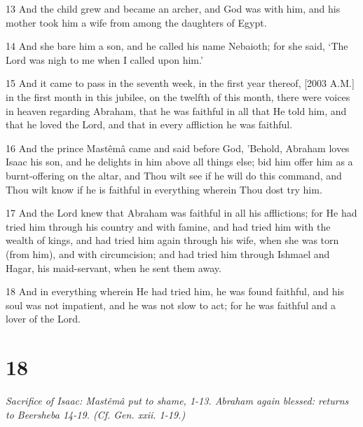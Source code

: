 \par 13 And the child grew and became an archer, and God was with him, and his mother took him a wife from among the daughters of Egypt.
\par 14 And she bare him a son, and he called his name Nebaioth; for she said, ‘The Lord was nigh to me when I called upon him.’
\par 15 And it came to pass in the seventh week, in the first year thereof, [2003 A.M.] in the first month in this jubilee, on the twelfth of this month, there were voices in heaven regarding Abraham, that he was faithful in all that He told him, and that he loved the Lord, and that in every affliction he was faithful.
\par 16 And the prince Mastêmâ came and said before God, 'Behold, Abraham loves Isaac his son, and he delights in him above all things else; bid him offer him as a burnt-offering on the altar, and Thou wilt see if he will do this command, and Thou wilt know if he is faithful in everything wherein Thou dost try him.
\par 17 And the Lord knew that Abraham was faithful in all his afflictions; for He had tried him through his country and with famine, and had tried him with the wealth of kings, and had tried him again through his wife, when she was torn (from him), and with circumcision; and had tried him through Ishmael and Hagar, his maid-servant, when he sent them away.
\par 18 And in everything wherein He had tried him, he was found faithful, and his soul was not impatient, and he was not slow to act; for he was faithful and a lover of the Lord.

\chapter{18}

\par \textit{Sacrifice of Isaac: Mastêmâ put to shame, 1-13. Abraham again blessed: returns to Beersheba 14-19. (Cf. Gen. xxii. 1-19.)}

